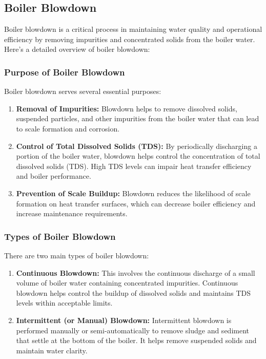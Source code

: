 \subsection{Boiler Blowdown}

Boiler blowdown is a critical process in maintaining water quality and operational efficiency by removing impurities and concentrated solids from the boiler water. Here's a detailed overview of boiler blowdown:

\subsubsection{Purpose of Boiler Blowdown}

Boiler blowdown serves several essential purposes:
\begin{enumerate}
    \item \textbf{Removal of Impurities:} Blowdown helps to remove dissolved solids, suspended particles, and other impurities from the boiler water that can lead to scale formation and corrosion.
    \item \textbf{Control of Total Dissolved Solids (TDS):} By periodically discharging a portion of the boiler water, blowdown helps control the concentration of total dissolved solids (TDS). High TDS levels can impair heat transfer efficiency and boiler performance.
    \item \textbf{Prevention of Scale Buildup:} Blowdown reduces the likelihood of scale formation on heat transfer surfaces, which can decrease boiler efficiency and increase maintenance requirements.
\end{enumerate}

\subsubsection{Types of Boiler Blowdown}

There are two main types of boiler blowdown:
\begin{enumerate}
    \item \textbf{Continuous Blowdown:} This involves the continuous discharge of a small volume of boiler water containing concentrated impurities. Continuous blowdown helps control the buildup of dissolved solids and maintains TDS levels within acceptable limits.
    \item \textbf{Intermittent (or Manual) Blowdown:} Intermittent blowdown is performed manually or semi-automatically to remove sludge and sediment that settle at the bottom of the boiler. It helps remove suspended solids and maintain water clarity.
\end{enumerate}

